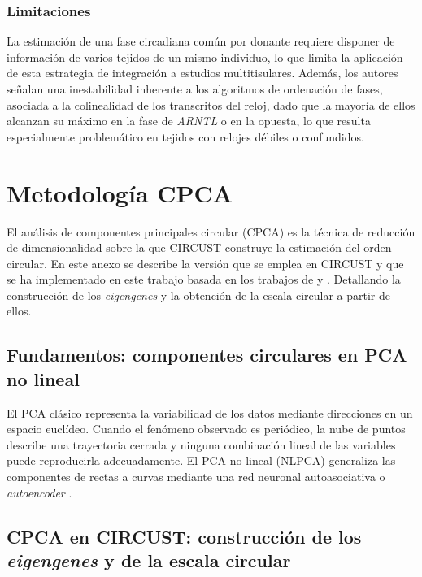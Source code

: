 \documentclass[12pt, a4paper]{report}
\begin{document}
\subsubsection*{Limitaciones}
La estimación de una fase circadiana común por donante requiere disponer de información de varios tejidos de un mismo individuo, lo que limita la aplicación de esta estrategia de integración a estudios multitisulares. Además, los autores señalan una inestabilidad inherente a los algoritmos de ordenación de fases, asociada a la colinealidad de los transcritos del reloj, dado que la mayoría de ellos alcanzan su máximo en la fase de \textit{ARNTL} o en la opuesta, lo que resulta especialmente problemático en tejidos con relojes débiles o confundidos.

\section{Metodología CPCA}
\label{sec:MetodologiaCPCA}

El análisis de componentes principales circular (CPCA) es la técnica de reducción de dimensionalidad sobre la que CIRCUST construye la estimación del orden circular. En este anexo se describe la versión que se emplea en CIRCUST y que se ha implementado en este trabajo basada en los trabajos de \citet{CPCAKirby} y \citet{scholz2007}. Detallando la construcción de los \emph{eigengenes} y la obtención de la escala circular a partir de ellos.

\subsection{Fundamentos: componentes circulares en PCA no lineal}

El PCA clásico representa la variabilidad de los datos mediante direcciones en un espacio euclídeo. Cuando el fenómeno observado es periódico, la nube de puntos describe una trayectoria cerrada y ninguna combinación lineal de las variables puede reproducirla adecuadamente. El PCA no lineal (NLPCA) generaliza las componentes de rectas a curvas mediante una red neuronal autoasociativa o \textit{autoencoder} \citep{scholz2007}.
\subsection{CPCA en CIRCUST: construcción de los \emph{eigengenes} y de la escala circular}
\end{document}

